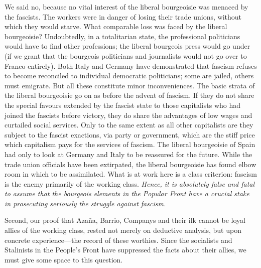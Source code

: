 We said no, because no vital interest of the liberal bourgeoisie was menaced by the fascists. The workers were in danger of losing their trade unions, without which they would starve. What comparable loss was faced by the liberal bourgeoisie? Undoubtedly, in a totalitarian state, the professional politicians would have to find other professions; the liberal bourgeois press would go under (if we grant that the bourgeois politicians and journalists would not go over to Franco entirely). Both Italy and Germany have demonstrated that fascism refuses to become reconciled to individual democratic politicians; some are jailed, others must emigrate. But all these constitute minor inconveniences. The basic strata of the liberal bourgeoisie go on as before the advent of fascism. If they do not share the special favours extended by the fascist state to those capitalists who had joined the fascists before victory, they do share the advantages of low wages and curtailed social services. Only to the same extent as all other capitalists are they subject to the fascist exactions, via party or government, which are the stiff price which capitalism pays for the services of fascism. The liberal bourgeoisie of Spain had only to look at Germany and Italy to be reassured for the future. While the trade union officials have been extirpated, the liberal bourgeoisie has found elbow room in which to be assimilated. What is at work here is a class criterion: fascism is the enemy primarily of the working class. \emph{Hence, it is absolutely false and fatal to assume that the bourgeois elements in the Popular Front have a crucial stake in prosecuting seriously the struggle against fascism.}

Second, our proof that Azaña, Barrio, Companys and their ilk cannot be loyal allies of the working class, rested not merely on deductive analysis, but upon concrete experience---the record of these worthies. Since the socialists and Stalinists in the People’s Front have suppressed the facts about their allies, we must give some space to this question.

